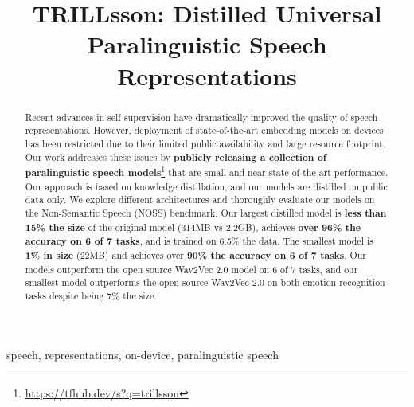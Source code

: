 \documentclass{article}
\title{TRILLsson: Distilled Universal Paralinguistic Speech Representations}
\begin{document}
%
\maketitle
%
\begin{abstract}
Recent advances in self-supervision have dramatically improved the quality of speech representations.
However, deployment of state-of-the-art embedding models on devices has been restricted due to their limited public availability and large resource footprint.
Our work addresses these issues by \textbf{publicly releasing a collection of paralinguistic speech models}\footnote[1]{\scriptsize\url{https://tfhub.dev/s?q=trillsson}} that are small and near state-of-the-art performance. Our approach is based on knowledge distillation, and our models are distilled on public data only. We explore different architectures 
and thoroughly evaluate our models on the Non-Semantic Speech (NOSS) benchmark.
Our largest distilled model is \textbf{less than 15\% the size} of the original model (314MB vs 2.2GB), achieves \textbf{over 96\% the accuracy on 6 of 7 tasks}, and is trained on 6.5\% the data. The smallest model is \textbf{1\% in size} (22MB) and achieves over \textbf{90\% the accuracy on 6 of 7 tasks}. Our models outperform the open source Wav2Vec 2.0 model on 6 of 7 tasks, and our smallest model outperforms the open source Wav2Vec 2.0 on both emotion recognition tasks despite being 7\% the size.
\end{abstract}
%
\begin{keywords}
speech, representations, on-device, paralinguistic speech
\end{keywords}
%
\end{document}
